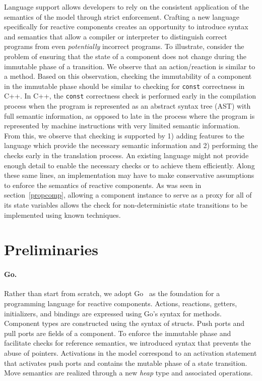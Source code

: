 Language support allows developers to rely on the consistent application of the semantics of the model through strict enforcement.
Crafting a new language specifically for reactive components creates an opportunity to introduce syntax and semantics that allow a compiler or interpreter to distinguish correct programs from even \emph{potentially} incorrect programs.
To illustrate, consider the problem of ensuring that the state of a component does not change during the immutable phase of a transition.
We observe that an action/reaction is similar to a method.
Based on this observation, checking the immutability of a component in the immutable phase should be similar to checking for \verb+const+ correctness in C++.
In C++, the \verb+const+ correctness check is performed early in the compilation process when the program is represented as an abstract syntax tree (AST) with full semantic information, as opposed to late in the process where the program is represented by machine instructions with very limited semantic information.
From this, we observe that checking is supported by 1) adding features to the language which provide the necessary semantic information and 2) performing the checks early in the translation process.
An existing language might not provide enough detail to enable the necessary checks or to achieve them efficiently.
Along these same lines, an implementation may have to make conservative assumptions to enforce the semantics of reactive components.
As was seen in section~\ref{propcomp}, allowing a component instance to serve as a proxy for all of its state variables allows the check for non-deterministic state transitions to be implemented using known techniques.

\section{Preliminaries}

\paragraph{Go.}
Rather than start from scratch, we adopt Go~\cite{go} as the foundation for a programming language for reactive components.
Actions, reactions, getters, initializers, and bindings are expressed using Go's syntax for methods.
Component types are constructed using the syntax of structs.
Push ports and pull ports are fields of a component.
To enforce the immutable phase and facilitate checks for reference semantics, we introduced syntax that prevents the abuse of pointers.
Activations in the model correspond to an activation statement that activates push ports and contains the mutable phase of a state transition.
Move semantics are realized through a new \emph{heap} type and associated operations.

